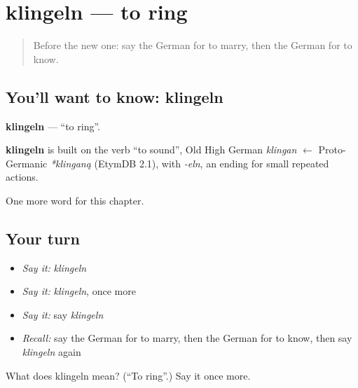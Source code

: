 \section[klingeln]{klingeln — to ring}

\label{lesson:GE-C147-klingeln}



\begin{quote}
Before the new one: say the German for to marry, then the German for to know.
\end{quote}

\subsection*{You'll want to know: klingeln}
\textbf{klingeln} — \textquotedblleft{}to ring\textquotedblright{}.

\begin{cousinweb}
\textbf{klingeln} is built on the verb \textquotedblleft{}to sound\textquotedblright{}, Old High German \emph{klingan} $\leftarrow$ Proto-Germanic \emph{*klinganą} (EtymDB 2.1), with \emph{-eln}, an ending for small repeated actions.
\end{cousinweb}

\begin{grammarlens}[title={What you've built}]
One more word for this chapter.
\end{grammarlens}

\subsection*{Your turn}
\begin{itemize}
\raggedright
  \item \emph{Say it:} \emph{klingeln}
  \item \emph{Say it:} \emph{klingeln}, once more
  \item \emph{Say it:} say \emph{klingeln}
  \item \emph{Recall:} say the German for to marry, then the German for to know, then say \emph{klingeln} again
\end{itemize}

\begin{tcolorbox}[breakable,colback=teal!4,colframe=teal!35!black,title={Before you move on}]
What does klingeln mean? (\textquotedblleft{}To ring\textquotedblright{}.) Say it once more.
\end{tcolorbox}
